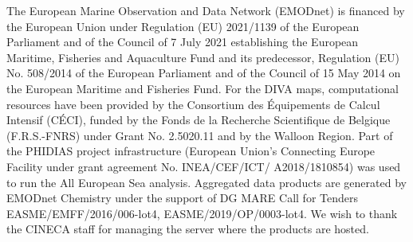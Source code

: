 \documentclass[essd, manuscript]{copernicus}
\begin{document}
\begin{acknowledgements}
The European Marine Observation and Data Network (EMODnet) is financed by the European Union under Regulation (EU) 2021/1139 of the European Parliament and of the Council of 7 July 2021 establishing the European Maritime, Fisheries and Aquaculture Fund and its predecessor, Regulation (EU) No. 508/2014 of the European Parliament and of the Council of 15 May 2014 on the European Maritime and Fisheries Fund. For the DIVA maps, computational resources have been provided by the Consortium des Équipements de Calcul Intensif (CÉCI), funded by the Fonds de la Recherche Scientifique de Belgique (F.R.S.-FNRS) under Grant No. 2.5020.11 and by the Walloon Region. Part of the PHIDIAS project infrastructure (European Union's Connecting Europe Facility under grant agreement No. INEA/CEF/ICT/ A2018/1810854) was used to run the All European Sea analysis. Aggregated data products are generated by EMODnet Chemistry under the support of DG MARE Call for Tenders EASME/EMFF/2016/006-lot4, EASME/2019/OP/0003-lot4. We wish to thank the CINECA staff for managing the server where the products are hosted.
\end{acknowledgements}







\end{document}
